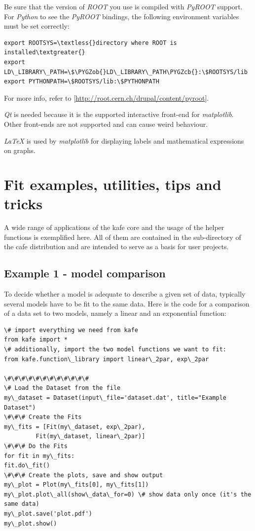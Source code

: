 \documentclass[a4paper,10pt,english]{sphinxmanual}
\def\PYGZob{\char`\{}
\def\PYGZcb{\char`\}}
\begin{document}
Be sure that the version of \emph{ROOT} you use is compiled with \emph{PyROOT} support.
For \emph{Python} to see the \emph{PyROOT} bindings, the following environment variables
must be set correctly:

\begin{Verbatim}[commandchars=\\\{\}]
export ROOTSYS=\textless{}directory where ROOT is installed\textgreater{}
export LD\_LIBRARY\_PATH=\$\PYGZob{}LD\_LIBRARY\_PATH\PYGZcb{}:\$ROOTSYS/lib
export PYTHONPATH=\$ROOTSYS/lib:\$PYTHONPATH
\end{Verbatim}

For more info, refer to {[}\href{http://root.cern.ch/drupal/content/pyroot}{http://root.cern.ch/drupal/content/pyroot}{]}.

\emph{Qt} is needed because it is the supported interactive front-end for
\emph{matplotlib}. Other front-ends are not supported and can cause weird behaviour.

\emph{LaTeX} is used by \emph{matplotlib} for displaying labels and mathematical
expressions on graphs.


\chapter{Fit examples, utilities, tips and tricks}
\label{index:fit-examples-utilities-tips-and-tricks}
A wide range of applications of the kafe core and the usage of
the helper functions is exemplified here. All of them
are contained in the sub-directory  of the
cafe distribution and are intended to serve as a basis for
user projects.


\section{Example 1 - model comparison}
\label{index:example-1-model-comparison}
To decide whether a model is adequate to describe a given
set of data, typically several models have to be fit to the
same data. Here is the code for a comparison of a data set
to two models, namely a linear and an exponential function:

\begin{Verbatim}[commandchars=\\\{\}]
\# import everything we need from kafe
from kafe import *
\# additionally, import the two model functions we want to fit:
from kafe.function\_library import linear\_2par, exp\_2par

\#\#\#\#\#\#\#\#\#\#\#\#
\# Load the Dataset from the file
my\_dataset = Dataset(input\_file='dataset.dat', title="Example Dataset")
\#\#\# Create the Fits
my\_fits = [Fit(my\_dataset, exp\_2par),
         Fit(my\_dataset, linear\_2par)]
\#\#\# Do the Fits
for fit in my\_fits:
fit.do\_fit()
\#\#\# Create the plots, save and show output
my\_plot = Plot(my\_fits[0], my\_fits[1])
my\_plot.plot\_all(show\_data\_for=0) \# show data only once (it's the same data)
my\_plot.save('plot.pdf')
my\_plot.show()
\end{Verbatim}
\end{document}
